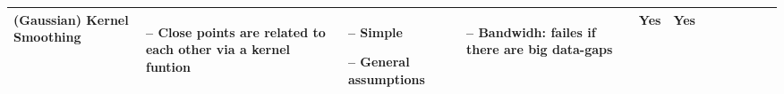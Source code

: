\begin{table}[!ht]
\begin{tabular}{p{1.6cm}p{3.3cm}p{3.3cm}p{3.4cm}p{0.4cm}p{0.4cm}p{3cm}p{3cm}p{3cm}p{3cm}p{2.7cm}p{3cm}|}
		(Gaussian) Kernel Smoothing                                                                                                                                  &
		\begin{cptitemize} \item[--]  Close points are related to each other via a kernel funtion \end{cptitemize}                                                                                                                                                            &
		\begin{cptitemize} \item[--]  Simple \item[--]  General assumptions                                                                  \end{cptitemize}        &
		\begin{cptitemize} \item[--]  Bandwidh: failes if there are big data-gaps                                                     \end{cptitemize}               &
		Yes                                                                                                                                                          &
		Yes                                                                                                                                                            \\ \hline%



\end{tabular}
\end{table}
